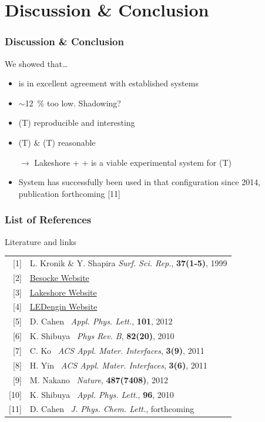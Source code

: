\documentclass{beamer}
\begin{document}
\section{Discussion \& Conclusion}
\begin{frame}
\frametitle{Discussion \& Conclusion}
\begin{block}{We showed that\dots}
\centering
\begin{itemize}
	\item \cpd{} is in excellent agreement with established systems
	\item \spv{} $\sim$\SI{12}{\percent} too low. Shadowing?
	\item \cpd{}(T) reproducible and interesting
	\item \cpd{}(T) \& \spv{}(T) reasonable
	\item[$\rightarrow$] Lakeshore + \McA{} + \led{} is a viable experimental system for \spv{}(T)
	\item System has successfully been used in that configuration since 2014, publication forthcoming \textcolor{RUred}{[11]}
\end{itemize}
\end{block}\end{frame}

\begin{frame}
\frametitle{List of References}
\begin{block}{Literature and links}
\centering
	\begin{tabular}{r l}
	\textcolor{RUred}{[1]} & L. Kronik \& Y. Shapira \emph{Surf. Sci. Rep.}, \textbf{37(1-5)}, 1999\\
	\textcolor{RUred}{[2]} & \href{http://www.besocke-delta-phi.de/kelvin.htm}{Besocke Website} \\
	\textcolor{RUred}{[3]} & \href{http://lakeshore.com/products/cryogenic-probe-stations/model-ttpx-cryogenic-probe-station/pages/Overview.aspx}{Lakeshore Website}\\
	\textcolor{RUred}{[4]} & \href{http://www.ledengin.com/files/products/LZP/LZP-00CW0R.pdf}{LEDengin Website}\\
	\textcolor{RUred}{[5]} & D. Cahen~\etal{} \emph{Appl. Phys. Lett.}, \textbf{101}, 2012\\
	\textcolor{RUred}{[6]} & K. Shibuya~\etal{} \emph{Phys Rev. B}, \textbf{82(20)}, 2010 \\
	\textcolor{RUred}{[7]} & C. Ko~\etal{} \emph{ACS Appl. Mater. Interfaces}, \textbf{3(9)}, 2011\\
	\textcolor{RUred}{[8]} & H. Yin~\etal{} \emph{ACS Appl. Mater. Interfaces}, \textbf{3(6)}, 2011 \\
	\textcolor{RUred}{[9]} & M. Nakano~\etal{} \emph{Nature}, \textbf{487(7408)}, 2012 \\
	\textcolor{RUred}{[10]} & K. Shibuya~\etal{} \emph{Appl. Phys. Lett.}, \textbf{96}, 2010 \\
	\textcolor{RUred}{[11]} & D. Cahen~\etal{} \emph{J. Phys. Chem. Lett.}, forthcoming \\
	\end{tabular}
\end{block}\end{frame}
\end{document}
